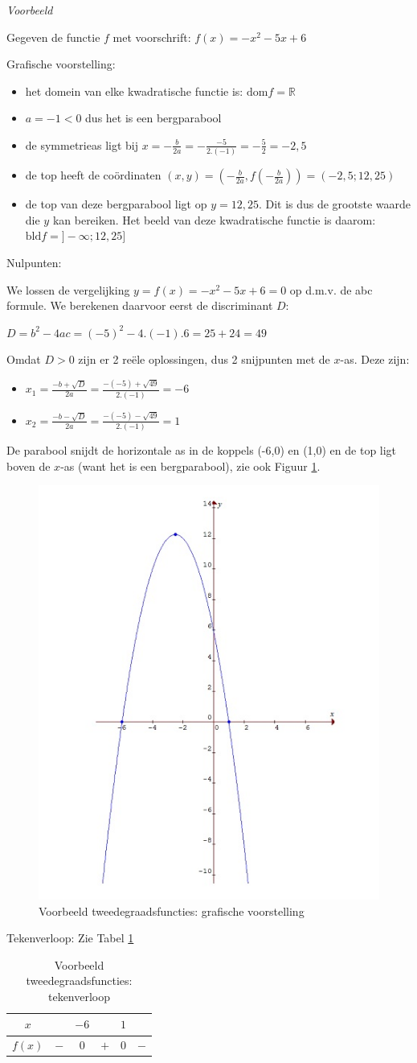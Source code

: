 \emph{Voorbeeld}

Gegeven de functie $f$ met voorschrift: $f(x)=-x^{2}-5x+6$ 

Grafische voorstelling:
\begin{itemize}
\item het domein van elke kwadratische functie is: $\textrm{dom}f=\mathbb{R}$
\item $a=-1<0$ dus het is een bergparabool
\item de symmetrieas ligt bij $x=-\frac{b}{2a}=-\frac{-5}{2.(-1)}=-\frac{5}{2}=-2,5$
\item de top heeft de co\"ordinaten $(x,y)=(-\frac{b}{2a},f(-\frac{b}{2a}))=(-2,5;12,25)$
\item de top van deze bergparabool ligt op $y=12,25$. Dit is dus de grootste
waarde die $y$ kan bereiken. Het beeld van deze kwadratische functie
is daarom: $\textrm{bld}f=]-\infty;12,25]$
\end{itemize}


Nulpunten:

\noindent We lossen de vergelijking $y=f(x)=-x^{2}-5x+6=0$ op d.m.v.
de abc formule. We berekenen daarvoor eerst de discriminant $D$:

$D=b^{2}-4ac=(-5)^{2}-4.(-1).6=25+24=49$

\noindent Omdat $D>0$ zijn er 2 re\"ele oplossingen, dus 2 snijpunten
met de $x$-as. Deze zijn:
\begin{itemize}
\item $x_{1}=\frac{-b+\sqrt{D}}{2a}=\frac{-(-5)+\sqrt{49}}{2.(-1)}=-6$
\item $x_{2}=\frac{-b-\sqrt{D}}{2a}=\frac{-(-5)-\sqrt{49}}{2.(-1)}=1$
\end{itemize}
De parabool snijdt de horizontale as in de koppels (-6,0) en (1,0)
en de top ligt boven de $x$-as (want het is een bergparabool), zie ook Figuur \ref{fig:tweede:vb}.

\begin{figure}[h]
\centering{}\includegraphics[width=.5\linewidth]{2_elem_rekenvaardigheden_B/inputs/tweedegraadsfuncties3.jpg}
\caption{Voorbeeld tweedegraadsfuncties: grafische voorstelling}
\label{fig:tweede:vb} 
\end{figure}


Tekenverloop:
Zie Tabel \ref{tab:tweede:vb}

\begin{table}[h]
	\centering
\begin{tabular}{c||c|c|c|c|c}
	$x$ &  & $-6$ &  & $1$ & \\
	\hline 
	$f(x)$ & $-$ & 0 & $+$ & 0 & $-$\\
\end{tabular}
\caption{Voorbeeld tweedegraadsfuncties: tekenverloop}
\label{tab:tweede:vb}	
\end{table}
